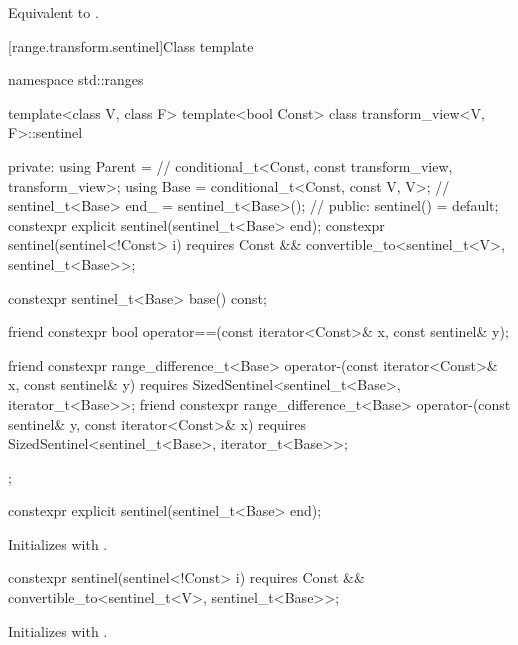 \begin{itemdescr}
\pnum
\effects Equivalent to .
\end{itemdescr}


[range.transform.sentinel]{Class template }

\begin{codeblock}
namespace std::ranges {
  template<class V, class F>
  template<bool Const>
  class transform_view<V, F>::sentinel {
  private:
    using Parent =                                      // \expos
      conditional_t<Const, const transform_view, transform_view>;
    using Base = conditional_t<Const, const V, V>;      // \expos
    sentinel_t<Base> end_ = sentinel_t<Base>();         // \expos
  public:
    sentinel() = default;
    constexpr explicit sentinel(sentinel_t<Base> end);
    constexpr sentinel(sentinel<!Const> i)
      requires Const && convertible_to<sentinel_t<V>, sentinel_t<Base>>;

    constexpr sentinel_t<Base> base() const;

    friend constexpr bool operator==(const iterator<Const>& x, const sentinel& y);

    friend constexpr range_difference_t<Base>
      operator-(const iterator<Const>& x, const sentinel& y)
        requires SizedSentinel<sentinel_t<Base>, iterator_t<Base>>;
    friend constexpr range_difference_t<Base>
      operator-(const sentinel& y, const iterator<Const>& x)
        requires SizedSentinel<sentinel_t<Base>, iterator_t<Base>>;
  };
}
\end{codeblock}

\begin{itemdecl}
constexpr explicit sentinel(sentinel_t<Base> end);
\end{itemdecl}

\begin{itemdescr}
\pnum
\effects Initializes  with .
\end{itemdescr}

\begin{itemdecl}
constexpr sentinel(sentinel<!Const> i)
  requires Const && convertible_to<sentinel_t<V>, sentinel_t<Base>>;
\end{itemdecl}

\begin{itemdescr}
\pnum
\effects Initializes  with .
\end{itemdescr}

